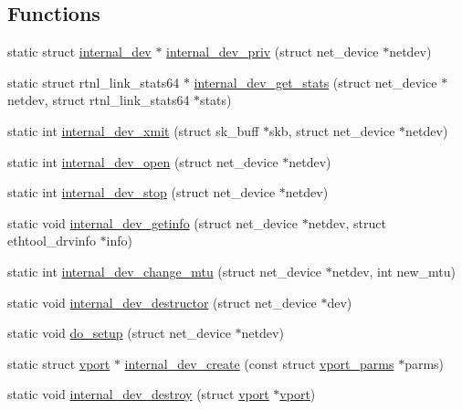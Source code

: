 \subsection*{Functions}
\begin{DoxyCompactItemize}
\item 
static struct \hyperlink{structinternal__dev}{internal\+\_\+dev} $\ast$ \hyperlink{vport-internal__dev_8c_a49d8093032133bbc7c7cd81fa7e541d6}{internal\+\_\+dev\+\_\+priv} (struct net\+\_\+device $\ast$netdev)
\item 
static struct rtnl\+\_\+link\+\_\+stats64 $\ast$ \hyperlink{vport-internal__dev_8c_a1b51a40ab3a7e2ac5d45d0862de0eecd}{internal\+\_\+dev\+\_\+get\+\_\+stats} (struct net\+\_\+device $\ast$netdev, struct rtnl\+\_\+link\+\_\+stats64 $\ast$stats)
\item 
static int \hyperlink{vport-internal__dev_8c_aafdf20e45216e64dfb927dbee0da1ec6}{internal\+\_\+dev\+\_\+xmit} (struct sk\+\_\+buff $\ast$skb, struct net\+\_\+device $\ast$netdev)
\item 
static int \hyperlink{vport-internal__dev_8c_ad76be69f068e92dd73ee48d599a37ee3}{internal\+\_\+dev\+\_\+open} (struct net\+\_\+device $\ast$netdev)
\item 
static int \hyperlink{vport-internal__dev_8c_ac0b3dbdb4d6a02faeb1b94c46fe1ceb7}{internal\+\_\+dev\+\_\+stop} (struct net\+\_\+device $\ast$netdev)
\item 
static void \hyperlink{vport-internal__dev_8c_a2b613f99606cc15239007e60575ee5f5}{internal\+\_\+dev\+\_\+getinfo} (struct net\+\_\+device $\ast$netdev, struct ethtool\+\_\+drvinfo $\ast$info)
\item 
static int \hyperlink{vport-internal__dev_8c_a4a8e78d5216e9cff945747582c010613}{internal\+\_\+dev\+\_\+change\+\_\+mtu} (struct net\+\_\+device $\ast$netdev, int new\+\_\+mtu)
\item 
static void \hyperlink{vport-internal__dev_8c_ab212be77fdf9605a4f70daf8f3888390}{internal\+\_\+dev\+\_\+destructor} (struct net\+\_\+device $\ast$dev)
\item 
static void \hyperlink{vport-internal__dev_8c_a63afed52200efd997d360e90a6a8bd11}{do\+\_\+setup} (struct net\+\_\+device $\ast$netdev)
\item 
static struct \hyperlink{structvport}{vport} $\ast$ \hyperlink{vport-internal__dev_8c_a08ffc4510ebd49d7ffdd031a112a18bb}{internal\+\_\+dev\+\_\+create} (const struct \hyperlink{structvport__parms}{vport\+\_\+parms} $\ast$parms)
\item 
static void \hyperlink{vport-internal__dev_8c_ab75c92e096800c974c1d1590e797cd2d}{internal\+\_\+dev\+\_\+destroy} (struct \hyperlink{structvport}{vport} $\ast$\hyperlink{structvport}{vport})

\end{DoxyCompactItemize}
